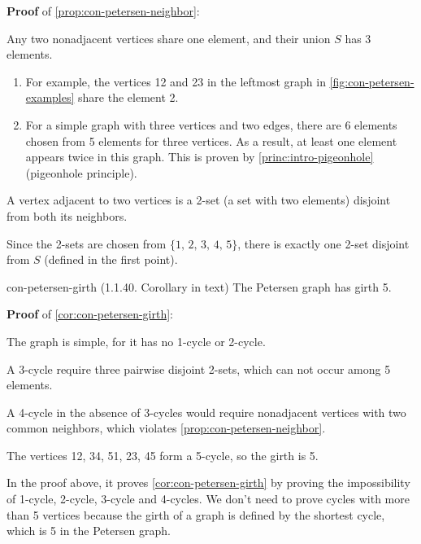 \documentclass[../src/handouts/main.tex]{subfiles}
\begin{document}
\textbf{Proof} of \cref{prop:con-petersen-neighbor}:

\begin{enumerate*}
  \item Any two nonadjacent vertices share one element, and their union $S$ has 3 elements.
    \begin{enumerate}
      \item For example, the vertices 12 and 23 in the leftmost graph in \cref{fig:con-petersen-examples} share the element 2.
      \item For a simple graph with three vertices and two edges, there are 6 elements chosen from 5 elements for three vertices. As a result, at least one element appears twice in this graph. This is proven by \cref{princ:intro-pigeonhole} (pigeonhole principle).
    \end{enumerate}
  \item A vertex adjacent to two vertices is a 2-set (a set with two elements) disjoint from both its neighbors.
  \item Since the 2-sets are chosen from $\{ 1,\, 2,\, 3,\, 4,\, 5 \}$, there is exactly one 2-set disjoint from $S$ (defined in the first point).
\end{enumerate*}

\begin{corollary}{}{con-petersen-girth}
  (1.1.40. Corollary in text)
  The Petersen graph has girth 5.
\end{corollary}

\textbf{Proof} of \cref{cor:con-petersen-girth}:
\begin{enumerate*}
  \item The graph is simple, for it has no 1-cycle or 2-cycle.
  \item A 3-cycle require three pairwise disjoint 2-sets, which can not occur among 5 elements.
  \item A 4-cycle in the absence of 3-cycles would require nonadjacent vertices with two common neighbors, which violates \cref{prop:con-petersen-neighbor}.
  \item The vertices 12, 34, 51, 23, 45 form a 5-cycle, so the girth is 5.
\end{enumerate*}

In the proof above, it proves \cref{cor:con-petersen-girth} by proving the impossibility of 1-cycle, 2-cycle, 3-cycle and 4-cycles. We don't need to prove cycles with more than 5 vertices because the girth of a graph is defined by the shortest cycle, which is 5 in the Petersen graph.
\end{document}

